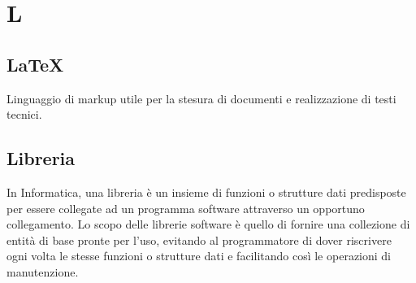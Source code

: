 \section*{L}

\subsection{LaTeX}
Linguaggio di markup utile per la stesura di documenti e realizzazione di testi tecnici. 

\subsection{Libreria}
In Informatica, una libreria è un insieme di funzioni o strutture dati predisposte per essere collegate ad un programma software attraverso un opportuno collegamento.
Lo scopo delle librerie software è quello di fornire una collezione di entità di base pronte per l'uso, evitando al programmatore di dover riscrivere ogni volta le stesse funzioni o strutture dati e facilitando così le operazioni di manutenzione. 
